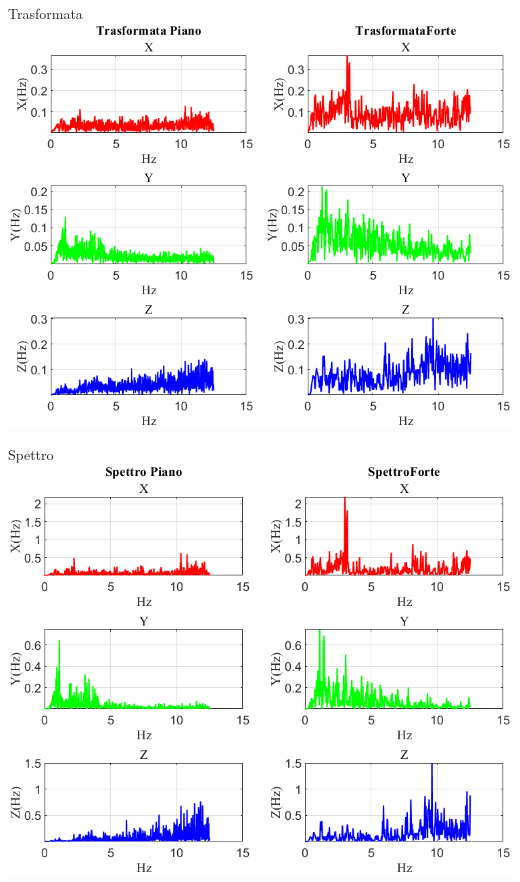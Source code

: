 \documentclass[beamer]{standalone}
\begin{document}
	\begin{frame}{{Trasformata}}
		\centering\includegraphics[height=.8\textheight]{figure/Acc/Trasformata/Trasformata}
	\end{frame}

	\begin{frame}{{Spettro}}
		\centering\includegraphics[height=.8\textheight]{figure/Acc/Trasformata/Spettro}
	\end{frame}
	
\end{document}
